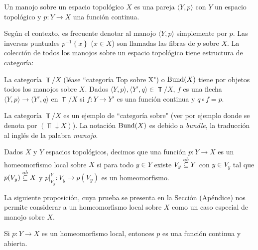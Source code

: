 \begin{Def}[Manojo]
    Un manojo sobre un espacio topológico $X$ es una pareja $\langle Y, p\rangle$ con $Y$ un espacio topológico y $p:Y\to X$ una función continua.
\end{Def}
Según el contexto, es frecuente denotar al manojo $\langle Y,p\rangle$ simplemente por $p$. Las inversas puntuales $p^{-1}\left\lbrace x\right\rbrace$ ($x\in X$) son llamadas las fibras de $p$ sobre $X$. La colección de todos los manojos sobre un espacio topológico tiene estructura de categoría:
\begin{Def}
   La categoría $\Top /X$ (léase ``categoría Top sobre X") o $\normalfont{\text{Bund}} (X)$ tiene por objetos todos los manojos sobre $X$. Dados $\langle Y,p\rangle,\langle Y',q\rangle\in \Top/X$, $f$ es una flecha $\langle Y,p\rangle\to\langle Y',q\rangle$ en $\Top/X$ si $f:Y\to Y'$ es una función continua y $q\circ f=p$.
   
\end{Def}
La categoría $\Top /X$ es un ejemplo de ``categoría sobre" (ver por ejemplo \cite[p.~45]{CWM} donde se denota por $(\Top\downarrow X)$). La notación $\normalfont{\text{Bund}} (X)$ es debido a \textit{bundle}, la traducción al inglés de la palabra \textit{manojo}. 
\begin{Def}
   Dados $X$ y $Y$ espacios topológicos, decimos que una función $p:Y\to X$ es un homeomorfismo local sobre $X$ si para todo $y\in Y$ existe $V_y\stackrel{ab}{\subseteq} Y$ con $y\in V_y$ tal que $p(V_y)\stackrel{ab}{\subseteq} X$ y $p|^{Y}_{V_y}:V_y\to p(V_y)$ es un homeomorfismo. 
\end{Def}
La siguiente proposición, cuya prueba se presenta en la Sección  (Apéndice) nos permite considerar a un homeomorfismo local sobre $X$ como un caso especial de manojo sobre $X$.
\begin{Prop}
   Si $p:Y\to X$ es un homeomorfismo local, entonces $p$ es una función continua y abierta.
\end{Prop}
